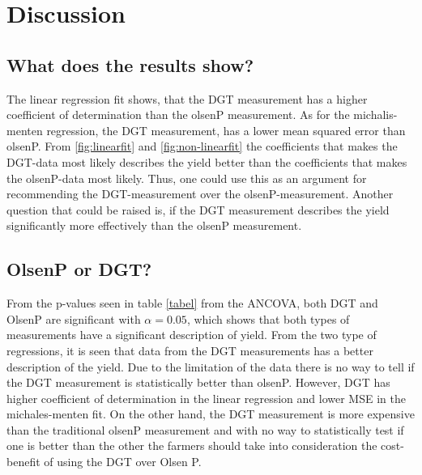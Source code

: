 \documentclass[11pt, fleqn, titlepage]{article}
\begin{document}
\section{Discussion}

\subsection*{What does the results show?}
The linear regression fit shows, that the DGT measurement has a higher coefficient of determination than the olsenP measurement. As for the michalis-menten regression, the DGT measurement, has a lower mean squared error than olsenP. From \ref{fig:linearfit} and \ref{fig:non-linearfit} the coefficients that makes the DGT-data most likely describes the yield better than the coefficients that makes the olsenP-data most likely. Thus, one could use this as an argument for recommending the DGT-measurement over the olsenP-measurement. Another question that could be raised is, if the DGT measurement describes the yield significantly more effectively than the olsenP measurement.

\subsection*{OlsenP or DGT?} 
From the p-values seen in table \ref{tabel} from the ANCOVA, both DGT and OlsenP are significant with $ \alpha = 0.05 $, which shows that both types of measurements have a significant description of yield. From the two type of regressions, it is seen that data from the DGT measurements has a better description of the yield. Due to the limitation of the data there is no way to tell if the DGT measurement is statistically better than olsenP. However, DGT has higher coefficient of determination in the linear regression and lower MSE in the michales-menten fit. On the other hand, the DGT measurement is more expensive than the traditional olsenP measurement and with no way to statistically test if one is better than the other the farmers should take into consideration the cost-benefit of using the DGT over Olsen P. 
\end{document}

